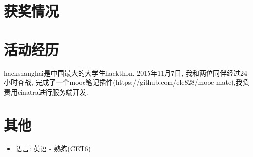 \documentclass{resume}
\begin{document}
\section{\faHeartO 获奖情况}

\section{\faUsers 活动经历}
hackshanghai是中国最大的大学生hackthon. 2015年11月7日, 我和两位同伴经过24小时奋战, 完成了一个mooc笔记插件(https://github.com/ele828/mooc-mate),我负责用cinatra进行服务端开发. 

\section{\faInfo 其他}
\begin{itemize}[parsep=0.5ex]
  \item 语言: 英语 - 熟练(CET6)
\end{itemize}

%
%
\end{document}
